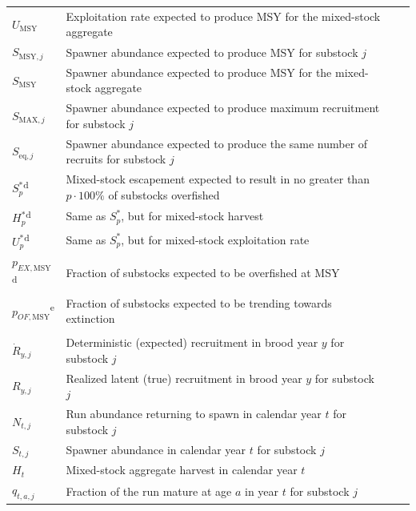 \documentclass[12pt,]{book}
\theoremstyle{definition}
\theoremstyle{definition}
\theoremstyle{definition}
\theoremstyle{remark}
\begin{document}
\begin{ThreePartTable}
\begin{longtable}[t]{l>{\raggedright\arraybackslash}p{400px}ll}
\hspace{1em}$U_{\text{MSY}}$ & Exploitation rate expected to produce MSY for the mixed-stock aggregate\\
\hspace{1em}$S_{\text{MSY},j}$ & Spawner abundance expected to produce MSY for substock $j$\\
\hspace{1em}$S_{\text{MSY}}$ & Spawner abundance expected to produce MSY for the mixed-stock aggregate\\
\hspace{1em}$S_{\text{MAX},j}$ & Spawner abundance expected to produce maximum recruitment for substock $j$\\
\hspace{1em}$S_{\text{eq},j}$ & Spawner abundance expected to produce the same number of recruits for substock $j$\\
\hspace{1em}$S^*_p$\textsuperscript{d} & Mixed-stock escapement expected to result in no greater than $p \cdot 100 \%$ of substocks overfished\\
\hspace{1em}$H^*_p$\textsuperscript{d} & Same as $S^*_p$, but for mixed-stock harvest\\
\hspace{1em}$U^*_p$\textsuperscript{d} & Same as $S^*_p$, but for mixed-stock exploitation rate\\
\hspace{1em}$p_{EX,\text{MSY}}$\textsuperscript{d} & Fraction of substocks expected to be overfished at MSY\\
\hspace{1em}$p_{OF,\text{MSY}}$\textsuperscript{e} & Fraction of substocks expected to be trending towards extinction\\
\addlinespace[0.3em]
\hline
\multicolumn{4}{l}{\textbf{States}}\\
\hline
\hspace{1em}$\dot{R}_{y,j}$ & Deterministic (expected) recruitment in brood year $y$ for substock $j$\\
\hspace{1em}$R_{y,j}$ & Realized latent (true) recruitment in brood year $y$ for substock $j$\\
\hspace{1em}$N_{t,j}$ & Run abundance returning to spawn in calendar year $t$ for substock $j$\\
\hspace{1em}$S_{t,j}$ & Spawner abundance in calendar year $t$ for substock $j$\\
\hspace{1em}$H_{t}$ & Mixed-stock aggregate harvest in calendar year $t$\\
\hspace{1em}$q_{t,a,j}$ & Fraction of the run mature at age $a$ in year $t$ for substock $j$\\*
\end{longtable}
\end{ThreePartTable}
\end{document}
